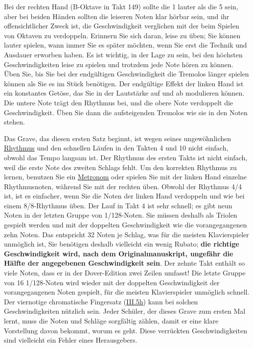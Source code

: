 Bei der rechten Hand (B-Oktave in Takt 149) sollte die 1 lauter als die 5 sein, aber bei beiden Händen sollten die leiseren Noten klar hörbar sein, und ihr offensichtlicher Zweck ist, die Geschwindigkeit verglichen mit der beim Spielen von Oktaven zu verdoppeln.
Erinnern Sie sich daran, leise zu üben; Sie können lauter spielen, wann immer Sie es später möchten, wenn Sie erst die Technik und Ausdauer erworben haben.
Es ist wichtig, in der Lage zu sein, bei den höchsten Geschwindigkeiten leise zu spielen und trotzdem jede Note hören zu können.
Üben Sie, bis Sie bei der endgültigen Geschwindigkeit die Tremolos länger spielen können als Sie es im Stück benötigen.
Der endgültige Effekt der linken Hand ist ein konstantes Getöse, das Sie in der Lautstärke auf und ab modulieren können.
Die untere Note trägt den Rhythmus bei, und die obere Note verdoppelt die Geschwindigkeit.
Üben Sie dann die aufsteigenden Tremolos wie sie in den Noten stehen.

Das Grave, das diesen ersten Satz beginnt, ist wegen seines ungewöhnlichen \hyperlink{c1iii1b}{Rhythmus} und den schnellen Läufen in den Takten 4 und 10 nicht einfach, obwohl das Tempo langsam ist.
Der Rhythmus des ersten Takts ist nicht einfach, weil die erste Note des zweiten Schlags fehlt.
Um den korrekten Rhythmus zu lernen, benutzen Sie ein \hyperlink{c1ii19}{Metronom} oder spielen Sie mit der linken Hand einzelne Rhythmusnoten, während Sie mit der rechten üben.
Obwohl der Rhythmus 4/4 ist, ist es einfacher, wenn Sie die Noten der linken Hand verdoppeln und wie bei einem 8/8-Rhythmus üben.
Der Lauf in Takt 4 ist sehr schnell; es gibt neun Noten in der letzten Gruppe von 1/128-Noten.
Sie müssen deshalb als Triolen gespielt werden und mit der doppelten Geschwindigkeit wie die vorangegangenen zehn Noten.
Das entspricht 32 Noten je Schlag, was für die meisten Klavierspieler unmöglich ist, Sie benötigen deshalb vielleicht ein wenig Rubato; \textbf{die richtige Geschwindigkeit wird, nach dem Originalmanuskript, ungefähr die Hälfte der angegebenen Geschwindigkeit sein}.
Der zehnte Takt enthält so viele Noten, dass er in der Dover-Edition zwei Zeilen umfasst!
Die letzte Gruppe von 16 1/128-Noten wird wieder mit der doppelten Geschwindigkeit der vorangegangenen Noten gespielt, für die meisten Klavierspieler unmöglich schnell.
Der viernotige chromatische Fingersatz (\hyperlink{c1iii5h}{III.5h}) kann bei solchen Geschwindigkeiten nützlich sein.
Jeder Schüler, der dieses Grave zum ersten Mal lernt, muss die Noten und Schläge sorgfältig zählen, damit er eine klare Vorstellung davon bekommt, worum es geht.
Diese verrückten Geschwindigkeiten sind vielleicht ein Fehler eines Herausgebers.

